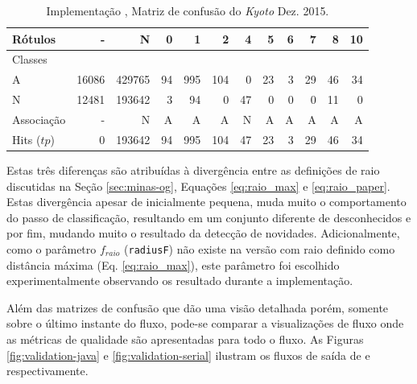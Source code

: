 \begin{table}[hbt]%
  \begin{center}
  \caption{Implementação \serial, Matriz de confusão do \dataset \emph{Kyoto} Dez. 2015.}
  \label{tab:libc-matrix}
  \begin{tabular}{l|r|r|r|r|r|r|r|r|r|r|r}
    Rótulos &      - &       N &   0 &    1 &    2 &   4 &   5 &  6 &   7 &   8 &  10 \\\hline
    Classes  &        &         &     &      &      &     &     &    &     &     &     \\\hline
    \hline
    A        &  16086 &  429765 &  94 &  995 &  104 &   0 &  23 &  3 &  29 &  46 &  34 \\\hline
    N        &  12481 &  193642 &   3 &   94 &    0 &  47 &   0 &  0 &   0 &  11 &   0 \\\hline
    \hline
    Associação &      - &       N &   A &    A &    A &   N &   A &  A &   A &   A &   A \\\hline
    Hits ($tp$)     &      0 &  193642 &  94 &  995 &  104 &  47 &  23 &  3 &  29 &  46 &  34 
  \end{tabular}
  \end{center}
\end{table}

Estas três diferenças são atribuídas à divergência entre as definições de raio
discutidas na Seção \ref{sec:minas-og}, Equações \ref{eq:raio_max} e
\ref{eq:raio_paper}.
Estas divergência apesar de inicialmente pequena, muda muito o comportamento do
passo de classificação, resultando em um conjunto diferente de desconhecidos e
por fim, mudando muito o resultado da detecção de novidades.
Adicionalmente, como o parâmetro $f_{raio}$ (\texttt{radiusF}) não existe na
versão com raio definido como distância máxima (Eq. \ref{eq:raio_max}), este
parâmetro foi escolhido experimentalmente observando os resultado durante a
implementação.

Além das matrizes de confusão que dão uma visão detalhada porém, somente sobre o
último instante do fluxo, pode-se comparar a visualizações de fluxo onde as
métricas de qualidade são apresentadas para todo o fluxo.
As Figuras \ref{fig:validation-java} e \ref{fig:validation-serial} ilustram os
fluxos de saída de  e \serial respectivamente.

